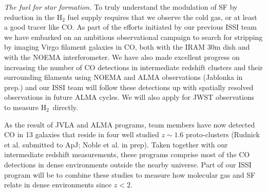\documentclass[11pt]{article}
\begin{document}
\textit{The fuel for star formation.} To truly understand the
modulation of SF by reduction in the H$_2$ fuel supply
requires that we observe the cold gas, or at least a good tracer like CO.  
As part of the efforts initiated by our previous ISSI team we have embarked on an ambitious observational campaign to search for stripping by imaging Virgo filament galaxies in CO, both with the IRAM 30m dish and with the NOEMA interferometer.   We have also made excellent progress on increasing the number of CO detections in intermediate redshift clusters and their surrounding filaments using NOEMA \citep{Jablonka13} and ALMA observations (Jablonka in prep.) and our ISSI team will follow these detections up with spatially resolved observations in future ALMA cycles.  We will also apply for JWST observations to measure H$_2$~directly.  

As the result of JVLA and ALMA programs, team members have now detected CO
in 13 galaxies that reside in four well studied $z\sim 1.6$ proto-clusters
(Rudnick et al. submitted to ApJ; Noble et al. in prep).  Taken together with our intermediate
redshift measurements, these programs comprise most of the CO
detections in dense environments outside the nearby universe.  Part of
our ISSI program will be to combine these studies to measure how
molecular gas and SF relate in dense environments since
$z<2$.  
\end{document}
